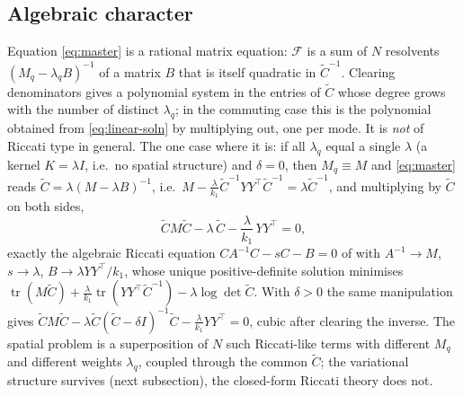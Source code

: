 \documentclass[11pt,a4paper]{article}
\newcommand{\tr}{\operatorname{tr}}
\newcommand{\Ct}{\tilde C}
\begin{document}
\subsection{Algebraic character}
Equation \eqref{eq:master} is a rational matrix equation: $\mathcal F$ is a sum of $N$ resolvents $(M_q - \lambda_q B)^{-1}$ of a matrix $B$ that is itself quadratic in $\Ct^{-1}$. Clearing denominators gives a polynomial system in the entries of $\Ct$ whose degree grows with the number of distinct $\lambda_q$; in the commuting case this is the polynomial obtained from \eqref{eq:linear-soln} by multiplying out, one per mode. It is \emph{not} of Riccati type in general. The one case where it is: if all $\lambda_q$ equal a single $\lambda$ (a kernel $K = \lambda I$, i.e.\ no spatial structure) and $\delta = 0$, then $M_q \equiv M$ and \eqref{eq:master} reads $\Ct = \lambda(M - \lambda B)^{-1}$, i.e.\ $M - \frac{\lambda}{k_1}\Ct^{-1}YY^\top\Ct^{-1} = \lambda\Ct^{-1}$, and multiplying by $\Ct$ on both sides,
\begin{equation}
  \Ct M \Ct - \lambda\,\Ct - \frac{\lambda}{k_1}\,YY^\top = 0,
  \label{eq:riccati}
\end{equation}
exactly the algebraic Riccati equation $CA^{-1}C - sC - B = 0$ of  with $A^{-1}\to M$, $s \to \lambda$, $B \to \lambda YY^\top/k_1$, whose unique positive-definite solution minimises $\tr(M\Ct) + \frac{\lambda}{k_1}\tr(YY^\top\Ct^{-1}) - \lambda\log\det\Ct$. With $\delta > 0$ the same manipulation gives $\Ct M\Ct - \lambda\Ct(\Ct-\delta I)^{-1}\Ct - \frac{\lambda}{k_1}YY^\top = 0$, cubic after clearing the inverse. The spatial problem is a superposition of $N$ such Riccati-like terms with different $M_q$ and different weights $\lambda_q$, coupled through the common $\Ct$; the variational structure survives (next subsection), the closed-form Riccati theory does not.
\end{document}
